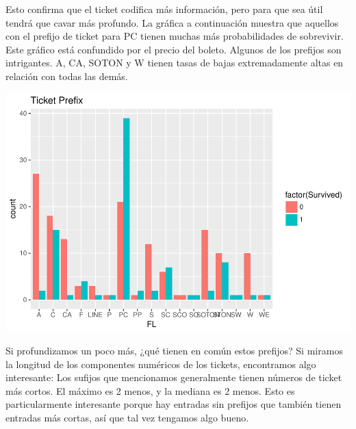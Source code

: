\documentclass[]{article}
\newenvironment{Shaded}{\begin{snugshade}}{\end{snugshade}}
\newcommand{\KeywordTok}[1]{\textcolor[rgb]{0.13,0.29,0.53}{\textbf{#1}}}
\newcommand{\StringTok}[1]{\textcolor[rgb]{0.31,0.60,0.02}{#1}}
\newcommand{\OperatorTok}[1]{\textcolor[rgb]{0.81,0.36,0.00}{\textbf{#1}}}
\newcommand{\NormalTok}[1]{#1}
\begin{document}
Esto confirma que el ticket codifica más información, pero para que sea
útil tendrá que cavar más profundo. La gráfica a continuación muestra
que aquellos con el prefijo de ticket para PC tienen muchas más
probabilidades de sobrevivir. Este gráfico está confundido por el precio
del boleto. Algunos de los prefijos son intrigantes. A, CA, SOTON y W
tienen tasas de bajas extremadamente altas en relación con todas las
demás.

\includegraphics{titanicDataClean_files/figure-latex/ticketplot-1.pdf}

Si profundizamos un poco más, ¿qué tienen en común estos prefijos? Si
miramos la longitud de los componentes numéricos de los tickets,
encontramos algo interesante: Los sufijos que mencionamos generalmente
tienen números de ticket más cortos. El máximo es 2 menos, y la mediana
es 2 menos. Esto es particularmente interesante porque hay entradas sin
prefijos que también tienen entradas más cortas, así que tal vez
tengamos algo bueno.

\begin{Shaded}
\end{Shaded}
\end{document}

